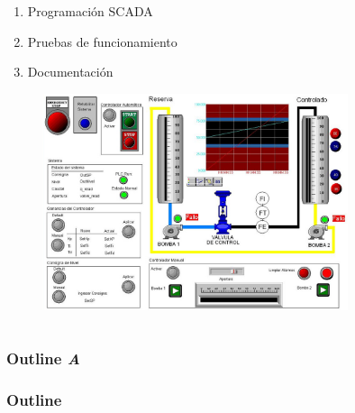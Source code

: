 \begin{frame}
\begin{columns}
	  \begin{column}{0.5\textwidth}
	  \begin{enumerate}
	    \item Programación SCADA
	    \item Pruebas de funcionamiento
	    \item Documentación
	   \end{enumerate}
	\begin{figure}[!ht]
	\centering
\includegraphics[width=0.8\textwidth]
{../Informe/Cap5-SCADA/images/hmiScada.jpeg}
	\end{figure}	  
	  \end{column}
	 \end{columns}

	 


\end{frame}

\begin{frame}
	\ifdebug
	\frametitle{Outline\hfill{\color{red} \emph{A}}}
	\else
	\frametitle{Outline}
	\fi

    \tableofcontents
\end{frame}
